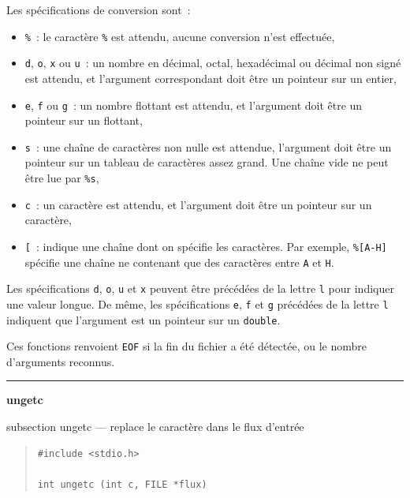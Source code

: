 \documentclass [twoside] {report}
\newcommand {\primitive} [1]
    {
	\phantomsection
	{\large \textbf {#1}}
	\addcontentsline {toc} {subsection} {#1}
    }
\newcommand {\separation}
    {
	\vspace {5mm}
	\nopagebreak
	\hrule
    }
\begin{document}
Les spécifications de conversion sont~:

\begin {itemize}
    \item \texttt {\%}~: le caractère \texttt {\%} est attendu, aucune conversion
	n'est effectuée, \par
    \item \texttt {d}, \texttt {o}, \texttt {x} ou \texttt {u}~: un nombre en décimal, octal,
	hexadécimal ou décimal non signé est attendu, et l'argument
	correspondant doit être un pointeur sur un entier, \par
    \item \texttt {e}, \texttt {f} ou \texttt {g}~: un nombre flottant est attendu, et
	l'argument doit être un pointeur sur un flottant, \par
    \item \texttt {s}~: une chaîne de caractères non nulle est attendue,
	l'argument doit être un pointeur sur un tableau de
	caractères assez grand. Une chaîne vide ne peut être lue par
	\texttt {\%s}, \par
    \item \texttt {c}~: un caractère est attendu, et l'argument doit être
	un pointeur sur un caractère, \par
    \item \texttt {[}~: indique une chaîne dont on spécifie les
	caractères. Par exemple, \texttt {\%[A-H]} spécifie une chaîne ne
	contenant que des caractères entre \texttt {A} et \texttt {H}.
\end {itemize}

Les spécifications \texttt {d}, \texttt {o}, \texttt {u} et \texttt {x} peuvent être
précédées de la lettre \texttt {l} pour indiquer une valeur longue.
De même, les spécifications \texttt {e}, \texttt {f} et \texttt {g} précédées
de la lettre \texttt {l} indiquent que l'argument est un pointeur
sur un \texttt {double}.

Ces fonctions renvoient \texttt {EOF} si la fin du fichier a été
détectée, ou le nombre d'arguments reconnus.



\separation
\primitive {ungetc} --- replace le caractère dans le flux d'entrée

\begin {quote}
\begin {verbatim}
#include <stdio.h>

int ungetc (int c, FILE *flux)
\end{verbatim}
\end {quote}
\end{document}
